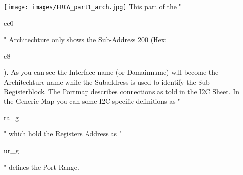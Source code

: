 \documentclass[a4paper,12pt]{report}
\begin{document}
\newline
\texttt{[image: images/FRCA\_part1\_arch.jpg]}\newline
This part of the "\begin{tt}cc0\end{tt}" Architechture only shows the Sub-Address 200 (Hex: \begin{tt}c8\end{tt}). As you can see the Interface-name (or Domainname) will become the Architechture-name while the Subaddress is used to identify the Sub-Registerblock. The Portmap describes connections as told in the I2C Sheet. In the Generic Map you can some I2C specific definitions as "\begin{tt}ra\_g\end{tt}" which hold the Registers Address as "\begin{tt}ur\_g\end{tt}" defines the Port-Range.
\end{document}
